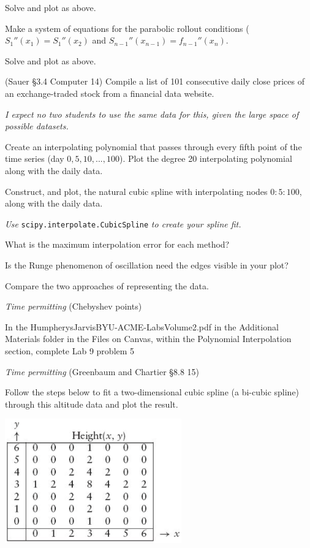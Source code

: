 \documentclass[12pt,letterpaper,noanswers]{exam}
\begin{document}
\begin{questions}
\begin{parts}
\item Solve and plot as above.

\item Make a system of equations for the parabolic rollout conditions ($S_1''(x_1) = S_1''(x_2)$ and $S_{n-1}''(x_{n-1}) = f_{n-1}''(x_n)$.  

\item Solve and plot as above.


\end{parts}

\item (Sauer \S3.4 Computer 14) Compile a list of 101 consecutive daily close prices of an exchange-traded stock from a financial data website.

\emph{I expect no two students to use the same data for this, given the large space of possible datasets.}

\begin{parts}
\item Create an interpolating polynomial that passes through every fifth point of the time series (day $0,5,10,...,100$).  Plot the degree 20 interpolating polynomial along with the daily data.  

\item Construct, and plot, the natural cubic spline with interpolating nodes $0:5:100$, along with the daily data.

\emph{Use} \texttt{scipy.interpolate.CubicSpline} \emph{to create your spline fit.}
\item What is the maximum interpolation error for each method?

Is the Runge phenomenon of oscillation need the edges visible in your plot?

Compare the two approaches of representing the data.
\end{parts}

\item \emph{Time permitting} 
(Chebyshev points)

In the HumpherysJarvisBYU-ACME-LabsVolume2.pdf in the Additional Materials folder in the Files on Canvas, within the Polynomial Interpolation section, complete Lab 9 problem 5

\item \emph{Time permitting} (Greenbaum and Chartier \S 8.8 15)

Follow the steps below to fit a two-dimensional cubic spline (a bi-cubic spline) through this altitude data and plot the result.

\includegraphics[width=3in]{img/PSet05hill.png}


\end{questions}
\end{document}
